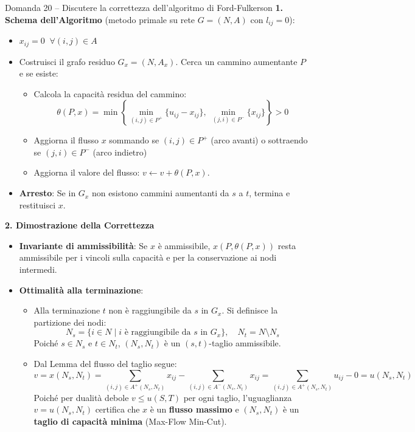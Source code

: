 \documentclass[12pt]{extarticle} %
\begin{document}
\begin{teoriabox}{Domanda 20 -- Discutere la correttezza dell'algoritmo di Ford-Fulkerson}
\textbf{1. Schema dell'Algoritmo} (metodo primale su rete $G=(N,A)$ con $l_{ij}=0$):
\begin{itemize}
    \item $x_{ij} = 0 \;\; \forall (i,j) \in A$
    \item Costruisci il grafo residuo $G_x = (N, A_x)$. Cerca un cammino aumentante $P$ e se esiste:
    \begin{itemize}
        \item Calcola la capacità residua del cammino:
        \[
        \theta(P,x) = \min \left\{ \min_{(i,j)\in P^+} \{u_{ij} - x_{ij}\}, \; \min_{(j,i)\in P^-} \{x_{ij}\} \right\} > 0
        \]
        \item Aggiorna il flusso $x$ sommando se $(i,j) \in P^+$ (arco avanti) o sottraendo se $(j,i) \in P^-$ (arco indietro)
        \item Aggiorna il valore del flusso: $v \leftarrow v + \theta(P,x)$.
    \end{itemize}
    \item \textbf{Arresto}: Se in $G_x$ non esistono cammini aumentanti da $s$ a $t$, termina e restituisci $x$.
\end{itemize}

\vspace{0.5em}
\textbf{2. Dimostrazione della Correttezza}
\begin{itemize}
    \item \textbf{Invariante di ammissibilità}: Se $x$ è ammissibile, $x(P, \theta(P,x))$ resta ammissibile per i vincoli sulla capacità e per la conservazione ai nodi intermedi.
    \item \textbf{Ottimalità alla terminazione}:
    \begin{itemize}
        \item Alla terminazione $t$ non è raggiungibile da $s$ in $G_x$. Si definisce la partizione dei nodi:
        \[
        N_s = \{i \in N \mid i \text{ è raggiungibile da } s \text{ in } G_x\}, \quad N_t = N \setminus N_s
        \]
        Poiché $s \in N_s$ e $t \in N_t$, $(N_s, N_t)$ è un $(s,t)$-taglio ammissibile.
        \item Dal Lemma del flusso del taglio segue:
        \[
        v = x(N_s, N_t) = \sum_{(i,j)\in A^+(N_s, N_t)} x_{ij} - \sum_{(i,j)\in A^-(N_s, N_t)} x_{ij} = \sum_{(i,j)\in A^+(N_s, N_t)} u_{ij} - 0 = u(N_s, N_t)
        \]
        Poiché per dualità debole $v \le u(S, T)$ per ogni taglio, l'uguaglianza $v = u(N_s, N_t)$ certifica che $x$ è un \textbf{flusso massimo} e $(N_s, N_t)$ è un \textbf{taglio di capacità minima} (Max-Flow Min-Cut).
    \end{itemize}
\end{itemize}

\end{teoriabox}
\end{document}
